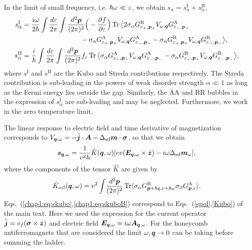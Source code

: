 In the limit of small frequency, i.e. $\hslash\omega\ll\varepsilon$, we obtain $s_\alpha = s^\text{I}_\alpha+s^\text{II}_\alpha$,
\begin{align}
    s^\text{I}_\alpha&=\frac{i\omega}{2\hslash}\int\frac{d\ep}{2\pi}\int \frac{d^2\bb{p}}{(2\pi)^2}\Big(-\frac{\partial f}{\partial \ep}\Big)\tr\big\langle
    2\sigma_\alpha G^\text{R}_{\ep_+,\bb{p}_+} V_{\omega,\bb{q}} G^\text{A}_{\ep_-,\bb{p}_-}
    \nonumber\\
    &\hspace{3cm}-\sigma_\alpha G^\text{A}_{\ep_+,\bb{p}_+} V_{\omega,\bb{q}} G^\text{A}_{\ep_-,\bb{p}_-} -\sigma_\alpha G^\text{R}_{\ep_+,\bb{p}_+} V_{\omega,\bb{q}} G^\text{R}_{\ep_-,\bb{p}_-}\big\rangle,\\
    s^\text{II}_\alpha&=\frac{i}{\hslash}\int\frac{d\ep}{2\pi}\int \frac{d^2\bb{p}}{(2\pi)^2} f_\ep \tr \big\langle\sigma_\alpha
    G^\text{A}_{\ep_+,\bb{p}_+} V_{\omega,\bb{q}} G^\text{A}_{\ep_-,\bb{p}_-}-
    \sigma_\alpha G^\text{R}_{\ep_+,\bb{p}_+} V_{\omega,\bb{q}} G^\text{R}_{\ep_-,\bb{p}_-}\big\rangle,
\end{align}
where $s^{\text{I}}$ and $s^\text{II}$ are the Kubo and Streda contributions respectively. The Streda contribution is sub-leading in the powers of weak disorder strength $\alpha\ll 1$ as long as the Fermi energy lies outside the gap. Similarly, the AA and RR bubbles in the expression of $s_\alpha^\text{I}$ are sub-leading and may be neglected. Furthermore, we work in the zero temperature limit. 

The linear response to electric field and time derivative of magnetization corresponds to $V_{\boldsymbol{q},\omega} = -\hat{\boldsymbol{j}}
\cdot\boldsymbol{A}-\Delta_\text{sd} \boldsymbol{m}\cdot\boldsymbol{\sigma}$, so that we obtain
\begin{equation}
  \boldsymbol{s}_{\boldsymbol{q},\omega}=\frac{1}{v^2h}\hat{K}(\boldsymbol{q},\omega)[ev(\boldsymbol{E}_{\boldsymbol{q},\omega}\times\hat{\boldsymbol{z}})-i\omega\Delta_{\text{sd}}\boldsymbol{m}_{\omega}],
  \label{chap1:eq:skubo}
\end{equation}
where the components of the tensor $\hat{K}$ are given by
\begin{equation}
\hat{K}_{\alpha\beta}(\boldsymbol{q},\omega)={v^2}\int\!\frac{d^2\boldsymbol{p}}{(2\pi)^2}\operatorname{Tr} \langle \sigma_\alpha G^\text{R}_{\boldsymbol{p}+ \hslash q,\varepsilon+\hslash\omega}\sigma_\beta G^\text{A}_{\boldsymbol{p},\varepsilon}\rangle.
\label{chap1:eq:skuboB}
\end{equation}
Eqs.~(\ref{chap1:eq:skubo},\ref{chap1:eq:skuboB}) correspond to Eqs.~(\ref{spol},\ref{Kubo}) of the main text. Here we used the expression for the current operator $\hat{\boldsymbol{j}} = v_f(\boldsymbol{\sigma}\times\hat{\boldsymbol{z}})$ and electric field $\boldsymbol{E}_{\boldsymbol{q},\omega}=i\omega \boldsymbol{A}_{\boldsymbol{q},\omega}$. For the honeycomb antiferromagnets that are considered the limit $\omega,\boldsymbol{q}\rightarrow0$ can be taking before summing the ladder. 